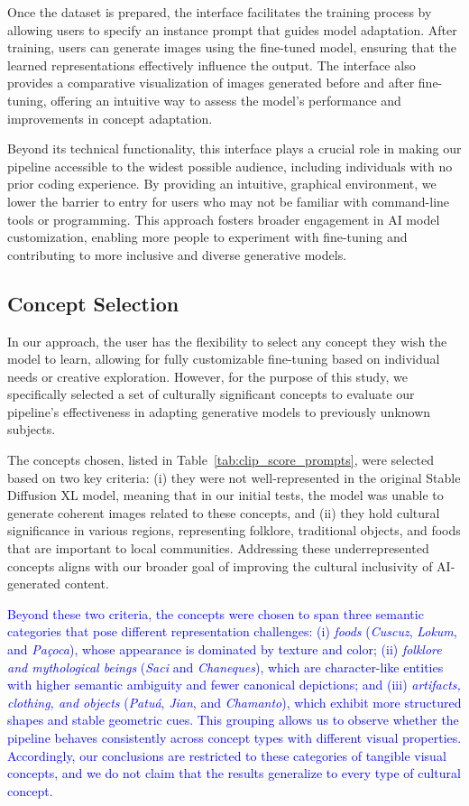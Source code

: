 \documentclass[pdflatex,sn-mathphys-num]{sn-jnl}%
\theoremstyle{thmstyleone}%
\theoremstyle{thmstyletwo}%
\theoremstyle{thmstylethree}%
\begin{document}
Once the dataset is prepared, the interface facilitates the training process by allowing users to specify an instance prompt that guides model adaptation. After training, users can generate images using the fine-tuned model, ensuring that the learned representations effectively influence the output. The interface also provides a comparative visualization of images generated before and after fine-tuning, offering an intuitive way to assess the model’s performance and improvements in concept adaptation.

Beyond its technical functionality, this interface plays a crucial role in making our pipeline accessible to the widest possible audience, including individuals with no prior coding experience. By providing an intuitive, graphical environment, we lower the barrier to entry for users who may not be familiar with command-line tools or programming. This approach fosters broader engagement in AI model customization, enabling more people to experiment with fine-tuning and contributing to more inclusive and diverse generative models.

\subsection{Concept Selection}
In our approach, the user has the flexibility to select any concept they wish the model to learn, allowing for fully customizable fine-tuning based on individual needs or creative exploration. However, for the purpose of this study, we specifically selected a set of culturally significant concepts to evaluate our pipeline’s effectiveness in adapting generative models to previously unknown subjects.

The concepts chosen, listed in Table~\ref{tab:clip_score_prompts}, were selected based on two key criteria: (i) they were not well-represented in the original Stable Diffusion XL model, meaning that in our initial tests, the model was unable to generate coherent images related to these concepts, and (ii) they hold cultural significance in various regions, representing folklore, traditional objects, and foods that are important to local communities. Addressing these underrepresented concepts aligns with our broader goal of improving the cultural inclusivity of AI-generated content.

\textcolor{blue}{Beyond these two criteria, the concepts were chosen to span three semantic categories that pose different representation challenges: (i) \emph{foods} (\textit{Cuscuz}, \textit{Lokum}, and \textit{Pa\c{c}oca}), whose appearance is dominated by texture and color; (ii) \emph{folklore and mythological beings} (\textit{Saci} and \textit{Chaneques}), which are character-like entities with higher semantic ambiguity and fewer canonical depictions; and (iii) \emph{artifacts, clothing, and objects} (\textit{Patu\'a}, \textit{Jian}, and \textit{Chamanto}), which exhibit more structured shapes and stable geometric cues. This grouping allows us to observe whether the pipeline behaves consistently across concept types with different visual properties. Accordingly, our conclusions are restricted to these categories of tangible visual concepts, and we do not claim that the results generalize to every type of cultural concept.}
\end{document}
